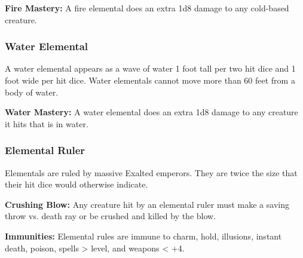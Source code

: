 \begin{multicols*}{2}
\textbf{Fire Mastery:} A fire elemental does an extra 1d8 damage to any cold-based creature.

\subsubsection{Water Elemental}
A water elemental appears as a wave of water 1 foot tall per two hit dice and 1 foot wide per hit dice. Water elementals cannot move more than 60 feet from a body of water.

\textbf{Water Mastery:} A water elemental does an extra 1d8 damage to any creature it hits that is in water.

\subsubsection{Elemental Ruler}
Elementals are ruled by massive Exalted emperors. They are twice the size that their hit dice would otherwise indicate.

\textbf{Crushing Blow:} Any creature hit by an elemental ruler must make a saving throw vs. death ray or be crushed and killed by the blow.

\textbf{Immunities:} Elemental rules are immune to charm, hold, illusions, instant death, poison, spells >  level, and weapons < +4.


\end{multicols*}
